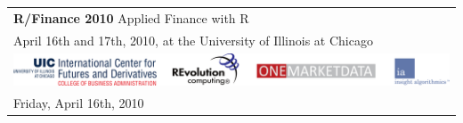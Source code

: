 \documentclass[11pt]{article}
\newcommand{\ra}[1]{\renewcommand{\arraystretch}{#1}}  %
\begin{document}
\thispagestyle{empty}


\ra{1.2} \sf

\begin{tabular}{rlrlp{5in}} %

  \multicolumn{5}{l}{\Huge \textbf{\color{KeynoteTalk} R/Finance 2010} \huge \phantom{i} Applied Finance with R} \\
  \multicolumn{5}{l}{\large \color{Breaks} April 16th and 17th, 2010, at the University of Illinois at Chicago} \\

  \bottomrule 

  \multicolumn{5}{l}{
    \centering
    \includegraphics[page=1,scale=0.15]{alllogos}
  }\\[20pt]

  \bottomrule 

  \multicolumn{5}{l}{\Large Friday, April 16th, 2010} \\


\end{tabular}
\end{document}
